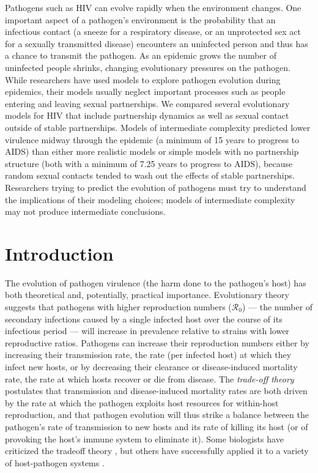 \documentclass[10pt,letterpaper]{article}
\newcommand{\rzero}{{\mathcal R}_0}
\begin{document}

Pathogens such as HIV can evolve rapidly when the environment changes.
One important aspect of a pathogen's environment is the probability that an infectious
contact (a sneeze for a respiratory disease, or an unprotected
sex act for a sexually transmitted disease) encounters an uninfected
person and thus has a chance to transmit the
pathogen. As an epidemic grows the number of
uninfected people shrinks, changing
evolutionary pressures on the pathogen.
While researchers have used models to explore
pathogen evolution during epidemics, their models usually neglect
important processes such as people entering and leaving sexual
partnerships. 
We compared several evolutionary models for HIV that include
partnership dynamics as well as sexual contact outside of stable
partnerships. Models of intermediate complexity predicted lower
virulence midway through the epidemic
(a minimum of 15 years to
progress to AIDS) than either more realistic models
or simple models with no partnership structure
(both with a minimum of 7.25 years to progress to AIDS), 
because random sexual contacts tended to wash out the effects of stable partnerships.
Researchers trying to predict the evolution of
pathogens must try to understand the implications of their
modeling choices; models of intermediate complexity may not
produce intermediate conclusions.

\linenumbers

\section*{Introduction}

The evolution of pathogen virulence 
(the harm done to the pathogen's host) has both 
theoretical and, potentially, practical
importance. 
Evolutionary theory suggests that
pathogens with higher reproduction numbers ($\rzero$) --- the number of secondary infections caused by a single infected host over the course of its infectious period --- will increase in prevalence relative to strains with lower reproductive ratios.
Pathogens can increase their reproduction numbers either
by increasing their transmission rate, 
the rate (per infected host) at which they
infect new hosts, or by decreasing their clearance or disease-induced
mortality rate, the rate
at which hosts recover or die from disease.
The \emph{trade-off theory} \cite{alizon_virulence_2009} postulates that
transmission and disease-induced mortality rates are both driven by the rate at which
the pathogen exploits host resources for within-host reproduction, 
and that pathogen
evolution will thus strike a balance between the
pathogen's rate of transmission
to new hosts and its rate of killing its host (or of provoking
the host's immune system to eliminate it).
Some biologists have criticized the tradeoff theory
\cite{EbertBull2003,alizon_adaptive_2015}, but others have
successfully applied it to a variety of host-pathogen systems \cite{Dwyer+1990,mackinnon1999genetic,jensen2006empirical,deroode2008virulence}.
\end{document}
